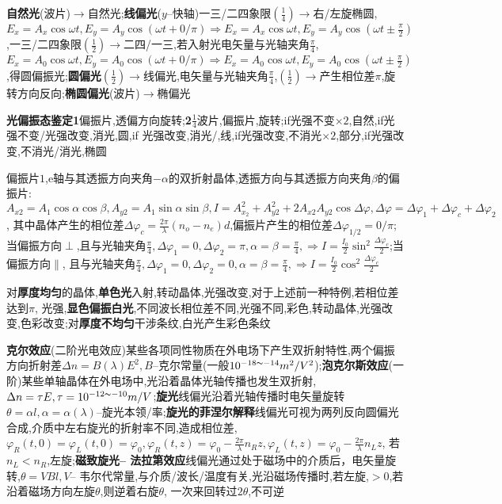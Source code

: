 \documentclass[10pt,a4paper]{article}
\begin{document}
\textbf{自然光}(波片)$\to$自然光;\textbf{线偏光}($y$--快轴)一三/二四象限$(\frac{1}{4})\to$右/左旋椭圆,$E_x=A_x\cos\omega t,E_y=A_y\cos(\omega t+0/\pi)\Longrightarrow E_x=A_x\cos\omega t,E_y=A_y\cos(\omega t\pm\frac{\pi}{2})$,一三/二四象限$(\frac{1}{2})\to$二四/一三,若入射光电矢量与光轴夹角$\frac{\pi}{4}$,$E_x=A_0\cos\omega t,E_y=A_0\cos(\omega t+0/\pi)\Longrightarrow E_x=A_0\cos\omega t,E_y=A_0\cos(\omega t\pm\frac{\pi}{2})$,得圆偏振光;\textbf{圆偏光}$(\frac{1}{2})\to$线偏光,电矢量与光轴夹角$\frac{\pi}{4}$,$(\frac{1}{2})\to$产生相位差$\pi$,旋转方向反向;\textbf{椭圆偏光}(波片)$\to$椭偏光

\textbf{光偏振态鉴定1}偏振片,透偏方向旋转;\textbf{2}$\frac{1}{4}$波片,偏振片,旋转;if光强不变$\times2$,自然,if光强不变/光强改变,消光,圆,if 光强改变,消光/,线,if光强改变,不消光$\times2$,部分,if光强改变,不消光/消光,椭圆

偏振片$1$,e轴与其透振方向夹角$-\alpha$的双折射晶体,透振方向与其透振方向夹角$\beta$的偏振片:$A_{x2}=A_1\cos\alpha\cos\beta,A_{y2}=A_1\sin\alpha\sin\beta,I=A_{x_2}^2+A_{y2}^2+2A_{x2}A_{y2}\cos\Delta\varphi,\Delta\varphi=\Delta\varphi_1+\Delta\varphi_c+\Delta\varphi_2$, 其中晶体产生的相位差$\Delta\varphi_c=\frac{2\pi}{\lambda}(n_o-n_e)d$,偏振片产生的相位差$\Delta\varphi_{1/2}=0/\pi$;当偏振方向$\perp$,且与光轴夹角$\frac{\pi}{4},\Delta\varphi_1=0,\Delta\varphi_2=\pi,\alpha=\beta=\frac{\pi}{4},\Longrightarrow I=\frac{I_0}{2}\sin^2\frac{\Delta\varphi_c}{2}$;当偏振方向$\parallel$, 且与光轴夹角$\frac{\pi}{4},\Delta\varphi_1=0,\Delta\varphi_2=0,\alpha=\beta=\frac{\pi}{4},\Longrightarrow I=\frac{I_0}{2}\cos^2\frac{\Delta\varphi_c}{2}$

对\textbf{厚度均匀}的晶体,\textbf{单色光}入射,转动晶体,光强改变,对于上述前一种特例,若相位差达到$\pi$, 光强,\textbf{显色偏振白光},不同波长相位差不同,光强不同,彩色,转动晶体,光强改变,色彩改变;对\textbf{厚度不均匀}干涉条纹,白光产生彩色条纹

\textbf{克尔效应}(二阶光电效应)某些各项同性物质在外电场下产生双折射特性,两个偏振方向折射差$\Delta n=B(\lambda)E^2,B$--克尔常量(一般$10^{-18\thicksim-14}m^2/V^2$);\textbf{泡克尔斯效应}(一阶)某些单轴晶体在外电场中,光沿着晶体光轴传播也发生双折射,$\Delta n=\tau E,\tau=10^{-12\thicksim-10}m/V$;\textbf{旋光}线偏光沿着光轴传播时电矢量旋转$\theta=\alpha l,\alpha=\alpha(\lambda)$--旋光本领/率;\textbf{旋光的菲涅尔解释}线偏光可视为两列反向圆偏光合成,介质中左右旋光的折射率不同,造成相位差,$\varphi_R(t,0)=\varphi_L(t,0)=\varphi_0,\varphi_R(t,z)=\varphi_0-\frac{2\pi}{\lambda}n_Rz,\varphi_L(t,z)=\varphi_0-\frac{2\pi}{\lambda}n_Lz$, 若$n_L<n_R$,左旋;\textbf{磁致旋光-- 法拉第效应}线偏光通过处于磁场中的介质后，电矢量旋转,$\theta=VBl,V$-- 韦尔代常量,与介质/波长/温度有关,光沿磁场传播时,若左旋,$>0$,若沿着磁场方向左旋$\theta$,则逆着右旋$\theta$, 一次来回转过$2\theta$,不可逆
\end{document}
